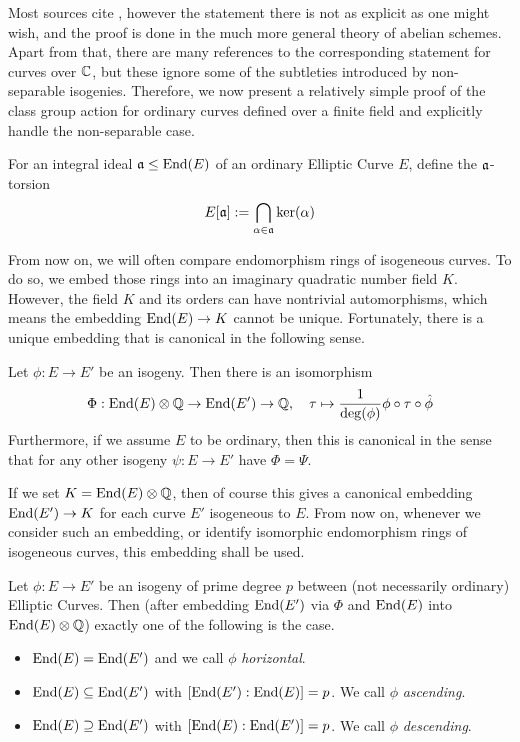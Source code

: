 Most sources cite \cite[Thm~4.5]{class_group_action_waterhouse}, however the statement there is not as explicit as one might wish, and the proof is done in the much more general theory of abelian schemes.
Apart from that, there are many references to the corresponding statement for curves over $\mathbb{C}$, but these ignore some of the subtleties introduced by non-separable isogenies. 
Therefore, we now present a relatively simple proof of the class group action for ordinary curves defined over a finite field and explicitly handle the non-separable case.
\begin{definition}
    For an integral ideal $\mathfrak{a} \leq \mathrm{End}(E)$ of an ordinary Elliptic Curve $E$, define the $\mathfrak{a}$-torsion
    \begin{equation*}
        E[\mathfrak{a}] := \bigcap_{\alpha \in \mathfrak{a}} \ker(\alpha)
    \end{equation*}
\end{definition}
From now on, we will often compare endomorphism rings of isogeneous curves.
To do so, we embed those rings into an imaginary quadratic number field $K$.
However, the field $K$ and its orders can have nontrivial automorphisms, which means the embedding $\mathrm{End}(E) \to K$ cannot be unique.
Fortunately, there is a unique embedding that is canonical in the following sense.
\begin{lemma}
    Let $\phi: E \to E'$ be an isogeny.
    Then there is an isomorphism
    \begin{equation*}
        \Phi: \mathrm{End}(E) \otimes \mathbb{Q} \to \mathrm{End}(E') \to \mathbb{Q}, \quad \tau \mapsto \frac 1 {\deg(\phi)} \phi \circ \tau \circ \hat{\phi}
    \end{equation*}
    Furthermore, if we assume $E$ to be ordinary, then this is canonical in the sense that for any other isogeny $\psi: E \to E'$ have $\Phi = \Psi$.
\end{lemma}
If we set $K = \mathrm{End}(E) \otimes \mathbb{Q}$, then of course this gives a canonical embedding $\mathrm{End}(E') \to K$ for each curve $E'$ isogeneous to $E$.
From now on, whenever we consider such an embedding, or identify isomorphic endomorphism rings of isogeneous curves, this embedding shall be used.
\begin{prop}
    Let $\phi: E \to E'$ be an isogeny of prime degree $p$ between (not necessarily ordinary) Elliptic Curves.
    Then (after embedding $\mathrm{End}(E')$ via $\Phi$ and $\mathrm{End}(E)$ into $\mathrm{End}(E) \otimes \mathbb{Q}$) exactly one of the following is the case.
    \begin{itemize}
        \item $\mathrm{End}(E) = \mathrm{End}(E')$ and we call $\phi$ \emph{horizontal}.
        \item $\mathrm{End}(E) \subseteq \mathrm{End}(E')$ with $[\mathrm{End}(E') : \mathrm{End}(E)] = p$. We call $\phi$ \emph{ascending}.
        \item $\mathrm{End}(E) \supseteq \mathrm{End}(E')$ with $[\mathrm{End}(E) : \mathrm{End}(E')] = p$. We call $\phi$ \emph{descending}.
    \end{itemize}
\end{prop}
